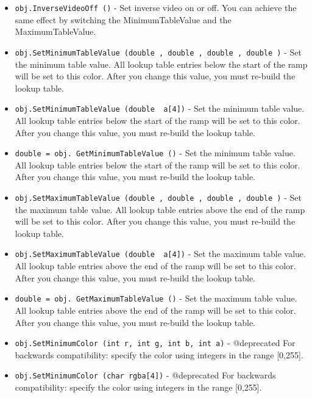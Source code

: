\begin{itemize}
\item  \verb|obj.InverseVideoOff ()| -  Set inverse video on or off.  You can achieve the same effect by
 switching the MinimumTableValue and the MaximumTableValue.

\item  \verb|obj.SetMinimumTableValue (double , double , double , double )| -  Set the minimum table value.  All lookup table entries below the
 start of the ramp will be set to this color.  After you change
 this value, you must re-build the lookup table.

\item  \verb|obj.SetMinimumTableValue (double  a[4])| -  Set the minimum table value.  All lookup table entries below the
 start of the ramp will be set to this color.  After you change
 this value, you must re-build the lookup table.

\item  \verb|double = obj. GetMinimumTableValue ()| -  Set the minimum table value.  All lookup table entries below the
 start of the ramp will be set to this color.  After you change
 this value, you must re-build the lookup table.

\item  \verb|obj.SetMaximumTableValue (double , double , double , double )| -  Set the maximum table value. All lookup table entries above the
 end of the ramp will be set to this color.  After you change
 this value, you must re-build the lookup table.

\item  \verb|obj.SetMaximumTableValue (double  a[4])| -  Set the maximum table value. All lookup table entries above the
 end of the ramp will be set to this color.  After you change
 this value, you must re-build the lookup table.

\item  \verb|double = obj. GetMaximumTableValue ()| -  Set the maximum table value. All lookup table entries above the
 end of the ramp will be set to this color.  After you change
 this value, you must re-build the lookup table.

\item  \verb|obj.SetMinimumColor (int r, int g, int b, int a)| -  @deprecated For backwards compatibility: specify the color using 
 integers in the range [0,255].  

\item  \verb|obj.SetMinimumColor (char rgba[4])| -  @deprecated For backwards compatibility: specify the color using 
 integers in the range [0,255].  


\end{itemize}
